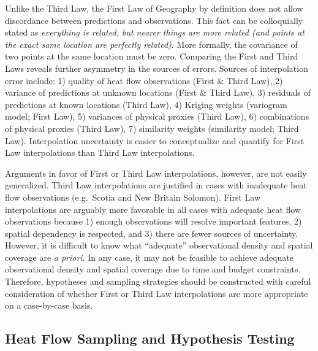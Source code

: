\documentclass[draft,linenumbers]{agujournal2018}
\begin{document}
Unlike the Third Law, the First Law of Geography by definition does not
allow discordance between predictions and observations. This fact can be
colloquially stated as \emph{everything is related, but nearer things
are more related (and points at the exact same location are perfectly
related)}. More formally, the covariance of two points at the same
location must be zero. Comparing the First and Third Laws reveals
further asymmetry in the sources of errors. Sources of interpolation
error include: 1) quality of heat flow observations (First \& Third
Law), 2) variance of predictions at unknown locations (First \& Third
Law), 3) residuals of predictions at known locations (Third Law), 4)
Kriging weights (variogram model; First Law), 5) variances of physical
proxies (Third Law), 6) combinations of physical proxies (Third Law), 7)
similarity weights (similarity model; Third Law). Interpolation
uncertainty is easier to conceptualize and quantify for First Law
interpolations than Third Law interpolations.

Arguments in favor of First or Third Law interpolations, however, are
not easily generalized. Third Law interpolations are justified in cases
with inadequate heat flow observations (e.g.~Scotia and New Britain
Solomon). First Law interpolations are arguably more favorable in all
cases with adequate heat flow observations because 1) enough
observations will resolve important features, 2) spatial dependency is
respected, and 3) there are fewer sources of uncertainty. However, it is
difficult to know what ``adequate'' observational density and spatial
coverage are \emph{a priori}. In any case, it may not be feasible to
achieve adequate observational density and spatial coverage due to time
and budget constraints. Therefore, hypotheses and sampling strategies
should be constructed with careful consideration of whether First or
Third Law interpolations are more appropriate on a case-by-case basis.

\subsection{Heat Flow Sampling and Hypothesis Testing}
\end{document}
